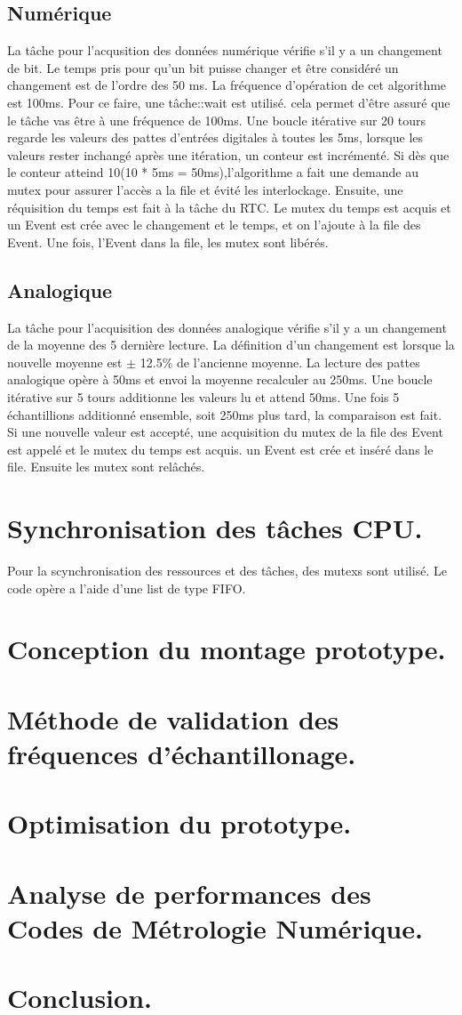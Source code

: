 \documentclass[12pt]{article}
\begin{document}
\subsection{Numérique}
La tâche pour l'acqusition des données numérique vérifie s'il y a un changement de bit. Le temps pris pour qu'un bit puisse changer et être considéré un changement est de l'ordre des 50 ms. La fréquence d'opération de cet algorithme est 100ms. Pour ce faire, une tâche::wait est utilisé. cela permet d'être assuré que le tâche vas être à une fréquence de 100ms. Une boucle itérative sur 20 tours regarde les valeurs des pattes d'entrées digitales à toutes les 5ms, lorsque les valeurs rester inchangé après une itération, un conteur est incrémenté. Si dès que le conteur atteind 10(10 * 5ms = 50ms),l'algorithme a fait une demande au mutex pour assurer l'accès a la file et évité les interlockage. Ensuite, une réquisition du temps est fait à la tâche du RTC. Le mutex du temps est acquis et un Event est crée avec le changement et le temps, et on l'ajoute à la file des Event. Une fois, l'Event dans la file, les mutex sont libérés.

\subsection{Analogique}
La tâche pour l'acquisition des données analogique vérifie s'il y a un changement de la moyenne des 5 dernière lecture. La définition d'un changement est lorsque la nouvelle moyenne est $\pm$ 12.5$\%$ de l'ancienne moyenne. La lecture des pattes analogique opère à 50ms et envoi la moyenne recalculer au 250ms. Une boucle itérative sur 5 tours additionne les valeurs lu et attend 50ms. Une fois 5 échantillions additionné ensemble, soit 250ms plus tard, la comparaison est fait. Si une nouvelle valeur est accepté, une acquisition du mutex de la file des Event est appelé et le mutex du temps est acquis. un Event est crée et inséré dans le file. Ensuite les mutex sont relâchés. 

\section{Synchronisation des tâches CPU.}
Pour la scynchronisation des ressources et des tâches, des mutexs sont utilisé. Le code opère a l'aide d'une list de type FIFO.
\section{Conception du montage prototype.}
\section{Méthode de validation des fréquences d'échantillonage.}
\section{Optimisation du prototype.}
\section{Analyse de performances des Codes de Métrologie Numérique.}
\section{Conclusion.}
\end{document}
